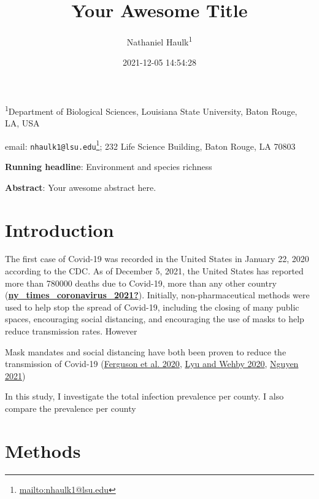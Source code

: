 \documentclass[
  12pt,
]{article}
\title{Your Awesome Title}
\author{Nathaniel Haulk\textsuperscript{1}}
\date{2021-12-05 14:54:28}
\DeclareRobustCommand{\href}[2]{#2\footnote{\url{#1}}}
\begin{document}
\maketitle

\renewcommand{\figurename}{{\textbf{Figure}}}
\renewcommand{\tablename}{{\textbf{Table}}}

\footnotesize

\textsuperscript{1}Department of Biological Sciences, Louisiana State University, Baton Rouge, LA, USA

email: \href{mailto:nhaulk1@lsu.edu}{\nolinkurl{nhaulk1@lsu.edu}}; 232 Life Science Building, Baton Rouge, LA 70803

\normalsize

\textbf{Running headline}: Environment and species richness

\textbf{Abstract}: Your awesome abstract here.

\clearpage

\hypertarget{introduction}{%
\section{Introduction}\label{introduction}}

The first case of Covid-19 was recorded in the United States in January 22, 2020 according to the CDC. As of December 5, 2021, the United States has reported more than 780000 deaths due to Covid-19, more than any other country (\protect\hyperlink{ref-ny_times_coronavirus_2021}{\textbf{ny\_times\_coronavirus\_2021?}}). Initially, non-pharmaceutical methods were used to help stop the spread of Covid-19, including the closing of many public spaces, encouraging social distancing, and encouraging the use of masks to help reduce transmission rates. However

Mask mandates and social distancing have both been proven to reduce the transmission of Covid-19 (\protect\hyperlink{ref-ferguson_report_2020}{Ferguson et al. 2020}, \protect\hyperlink{ref-lyu_community_2020}{Lyu and Wehby 2020}, \protect\hyperlink{ref-nguyen_mask_2021}{Nguyen 2021})

In this study, I investigate the total infection prevalence per county. I also compare the prevalence per county

\hypertarget{methods}{%
\section{Methods}\label{methods}}
\end{document}
